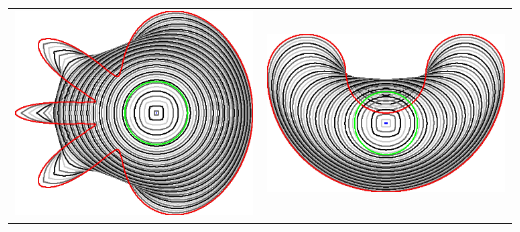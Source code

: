 \begin{frame}
\begin{center}
\begin{tabular}{cc}
\includegraphics[scale=0.12]{figures/graphcut/no-neighborhood-flow-always-evolve/0.015625/flower.png}\hspace{3em} &
\includegraphics[scale=0.12]{figures/graphcut/no-neighborhood-flow-always-evolve/0.015625/bean.png}
\end{tabular}
\end{center}


\end{frame}

